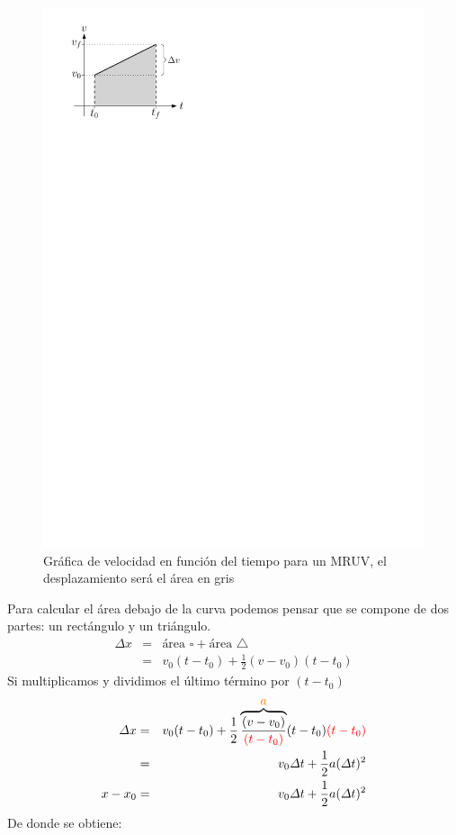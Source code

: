 \begin{figure}[!h]
\centering
\includegraphics{img/area2.pdf}
\caption{Gráfica de velocidad en función del tiempo para un MRUV, el desplazamiento será el área en gris}
\label{fig:area2}
\end{figure}

Para calcular el área debajo de la curva podemos pensar que se compone de dos partes: un rectángulo y un triángulo.
\begin{eqnarray*}
\Delta x & = & \mbox{área }\square + \mbox{área } \triangle \\
& = & v_0(t-t_0) + \frac{1}{2} (v-v_0) (t-t_0) 
\end{eqnarray*}
Si multiplicamos y dividimos el último término por $(t-t_0)$
\begin{eqnarray*}
\Delta x & = & v_0(t-t_0) + \frac{1}{2} \overbrace{\frac{(v-v_0)}{\textcolor{red}{(t-t_0)}}}^{\displaystyle\textcolor{orange}{a}} (t-t_0) \textcolor{red}{(t-t_0)} \\
 & = & v_0 \Delta t  +  \frac{1}{2} a (\Delta t)^2 \\
x-x_0 & = & v_0 \Delta t + \frac{1}{2} a (\Delta t)^2
\end{eqnarray*}
De donde se obtiene:
\begin{center}
{\color{ForestGreen}  }
\end{center}

